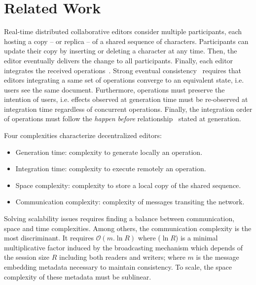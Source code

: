\section{Related Work}
\label{sec:relatedwork}

Real-time distributed collaborative editors consider multiple participants, each
hosting a copy -- or replica -- of a shared sequence of characters. Participants
can update their copy by inserting or deleting a character at any time. Then,
the editor eventually delivers the change to all participants. Finally, each
editor integrates the received operations~\cite{saito2005optimistic}. Strong
eventual consistency~\cite{bailis2013eventual, shapiro2011comprehensive,
  sun1998achieving} requires that editors integrating a same set of operations
converge to an equivalent state, i.e. users see the same document. Furthermore,
operations must preserve the intention of users, i.e. effects observed at
generation time must be re-observed at integration time regardless of concurrent
operations. Finally, the integration order of operations must follow the
\emph{happen before} relationship~\cite{lamport1978time} stated at generation.

Four complexities characterize decentralized editors:
\begin{itemize}
\item Generation time: complexity to generate locally an operation.
\item Integration time: complexity to execute remotely an operation.
\item Space complexity: complexity to store a local copy of the shared sequence.
\item Communication complexity: complexity of messages transiting the network.
\end{itemize}
Solving scalability issues requires finding a balance between communication,
space and time complexities.  Among others, the communication complexity is the
most discriminant. It requires $\mathcal{O}(m.\ln{R})$ where ($\ln{R}$) is a
minimal multiplicative factor induced by the broadcasting mechanism which
depends of the session size $R$ including both readers and writers; where $m$ is
the message embedding metadata necessary to maintain consistency. To scale, the
space complexity of these metadata must be sublinear.

